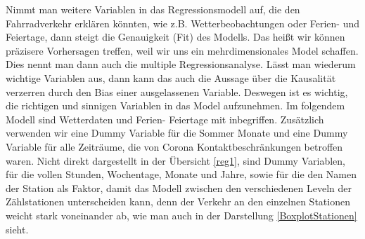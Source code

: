 \documentclass[a4paper,12pt]{thesis}
\begin{document}
Nimmt man weitere Variablen in das Regressionsmodell auf, die den Fahrradverkehr erklären könnten, wie z.B. Wetterbeobachtungen oder Ferien- und Feiertage, dann steigt die Genauigkeit (Fit) des Modells. Das heißt wir können präzisere Vorhersagen treffen, weil wir uns ein mehrdimensionales Model schaffen. Dies nennt man dann auch die multiple Regressionsanalyse. Lässt man wiederum wichtige Variablen aus, dann kann das auch die Aussage über die Kausalität verzerren durch den Bias einer ausgelassenen Variable. Deswegen ist es wichtig, die richtigen und sinnigen Variablen in das Model aufzunehmen. Im folgendem Modell sind Wetterdaten und Ferien- Feiertage mit inbegriffen. Zusätzlich verwenden wir eine Dummy Variable für die Sommer Monate und eine Dummy Variable für alle Zeiträume, die von Corona Kontaktbeschränkungen betroffen waren. Nicht direkt dargestellt in der Übersicht \ref{reg1}, sind Dummy Variablen, für die vollen Stunden, Wochentage, Monate und Jahre, sowie für die den Namen der Station als Faktor, damit das Modell zwischen den verschiedenen Leveln der Zählstationen unterscheiden kann, denn der Verkehr an den einzelnen Stationen weicht stark voneinander ab, wie man auch in der Darstellung \ref{BoxplotStationen} sieht.\\
\end{document}
